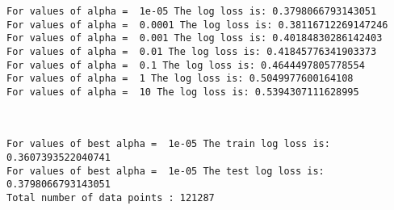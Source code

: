 \documentclass[11pt]{article}
\begin{document}
    \begin{Verbatim}[commandchars=\\\{\}]
For values of alpha =  1e-05 The log loss is: 0.3798066793143051
For values of alpha =  0.0001 The log loss is: 0.38116712269147246
For values of alpha =  0.001 The log loss is: 0.40184830286142403
For values of alpha =  0.01 The log loss is: 0.41845776341903373
For values of alpha =  0.1 The log loss is: 0.4644497805778554
For values of alpha =  1 The log loss is: 0.5049977600164108
For values of alpha =  10 The log loss is: 0.5394307111628995

    \end{Verbatim}

    \begin{center}
    \end{center}
    { \hspace*{\fill} \\}
    
    \begin{Verbatim}[commandchars=\\\{\}]
For values of best alpha =  1e-05 The train log loss is: 0.3607393522040741
For values of best alpha =  1e-05 The test log loss is: 0.3798066793143051
Total number of data points : 121287

    \end{Verbatim}

    \begin{center}
    \end{center}
    { \hspace*{\fill} \\}
    
\end{document}
